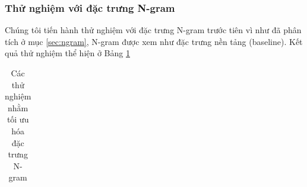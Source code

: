 \subsubsection*{Thử nghiệm với đặc trưng N-gram}
Chúng tôi tiến hành thử nghiệm với đặc trưng N-gram trước tiên vì như đã phân tích ở mục \ref{sec:ngram}, N-gram được xem như đặc trưng nền tảng (baseline). Kết quả thử nghiệm thể hiện ở Bảng \ref{table:ngram}
\begin{table}[H]
\centering
\begin{minipage}{1.0\textwidth}
\caption{Các thử nghiệm nhằm tối ưu hóa đặc trưng N-gram} \label{table:ngram}
\begin{tabular}{|l| m{} | >{\centering\arraybackslash} m{} | >{\centering\arraybackslash}m{} | >{\centering\arraybackslash}m{} | } 


\end{tabular}
\end{minipage}
\end{table}
